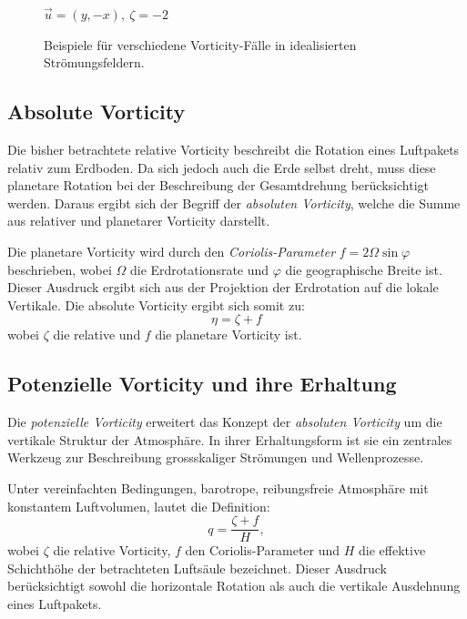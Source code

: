 \begin{figure}
\begin{minipage}{0.32\linewidth}
		{\small \( \vec{u} = (y,-x),\ \zeta = -2\)}
	\end{minipage}

	\caption{Beispiele für verschiedene Vorticity-Fälle in idealisierten Strömungsfeldern.}
	\label{fig:vorticity_examples}
\end{figure}

\subsection{Absolute Vorticity}

Die bisher betrachtete relative Vorticity beschreibt die Rotation eines
Luftpakets relativ zum Erdboden. Da sich jedoch auch die Erde selbst dreht,
muss diese planetare Rotation bei der Beschreibung der Gesamtdrehung
berücksichtigt werden. Daraus ergibt sich der Begriff der \emph{absoluten
	Vorticity}, welche die Summe aus relativer und planetarer Vorticity darstellt.

Die planetare Vorticity wird durch den \emph{Coriolis-Parameter} \(
f = 2 \Omega \sin \varphi \) beschrieben, wobei \( \Omega \) die
Erdrotationsrate und \( \varphi \) die geographische Breite ist. Dieser
Ausdruck ergibt sich aus der Projektion der Erdrotation auf die lokale
Vertikale. Die absolute Vorticity ergibt sich somit zu:
\begin{equation}
	\eta = \zeta + f
	\label{rossby:eq:absolute_vorticity}
\end{equation}
wobei \( \zeta \) die relative und \( f \) die planetare Vorticity ist.


\subsection{Potenzielle Vorticity und ihre Erhaltung}

Die \emph{potenzielle Vorticity} erweitert das Konzept der \emph{absoluten
Vorticity} um die vertikale Struktur der Atmosphäre. In ihrer Erhaltungsform
ist sie ein zentrales Werkzeug zur Beschreibung grossskaliger Strömungen und
Wellenprozesse.

Unter vereinfachten Bedingungen, barotrope, reibungsfreie Atmosphäre mit
konstantem Luftvolumen, lautet die Definition:
\begin{equation}
	q = \frac{\zeta + f}{H},
	\label{rossby:eq:potential_vorticity}
\end{equation}
wobei \(\zeta\) die relative Vorticity, \(f\) den Coriolis-Parameter und \(H\) die effektive Schichthöhe der betrachteten Luftsäule bezeichnet.
Dieser Ausdruck berücksichtigt sowohl die horizontale Rotation als auch die vertikale Ausdehnung eines Luftpakets. 

